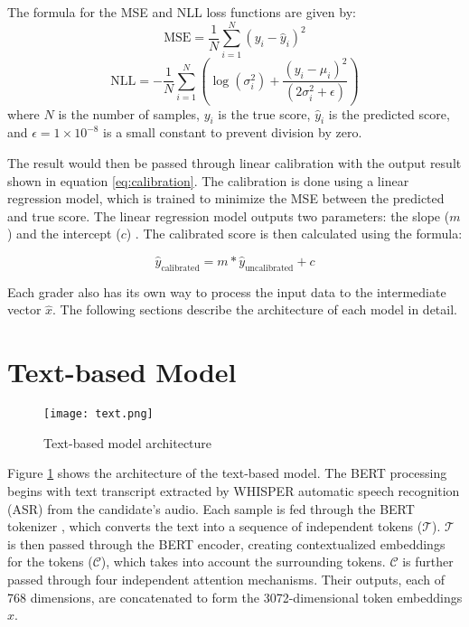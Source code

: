The formula for the MSE and NLL loss functions are given by:
\begin{equation} \label{eq:mse}
    \text{MSE} = \frac{1}{N} \sum_{i=1}^{N} (y_i - \hat{y}_i)^2
\end{equation}
\begin{equation} \label{eq:nll}
    \text{NLL} = -\frac{1}{N} \sum_{i=1}^{N} \left( \log(\sigma_i^2) + \frac{(y_i - \mu_i)^2}{(2\sigma_i^2 + \epsilon)} \right)
\end{equation}
where $N$ is the number of samples, $y_i$ is the true score,  $\hat{y}_i$ is the predicted score, and $\epsilon = 1\times10^{-8}$ is a small constant to prevent division by zero.

The result would then be passed through linear calibration with the output result shown in equation \ref{eq:calibration}. The calibration is done using a linear regression model, which is trained to minimize the MSE between the predicted and true score. The linear regression model outputs two parameters: the slope ($m$)  and the intercept ($c$) . The calibrated score is then calculated using the formula:

\begin{equation}
    \hat{y}_{\text{calibrated}} = m*\hat{y}_{\text{uncalibrated}} + c
    \label{eq:calibration}
\end{equation}

Each grader also has its own way to process the input data to the intermediate vector $\hat{x}$. The following sections describe the architecture of each model in detail.

\section{Text-based Model}
\begin{figure}[H]
    \centering
    \texttt{[image: text.png]}
    \caption{Text-based model architecture}
    \label{fig:text}
\end{figure}

Figure \ref{fig:text} shows the architecture of the text-based model. The BERT processing begins with text transcript extracted by WHISPER automatic speech recognition (ASR) from the candidate's audio. Each sample is fed through the BERT tokenizer , which converts the text into a sequence of independent tokens ($\mathcal{T}$). $\mathcal{T}$ is then passed through the BERT encoder, creating contextualized embeddings for the tokens ($\mathcal{C}$), which takes into account the surrounding tokens. $\mathcal{C}$ is further passed through four independent attention mechanisms. Their outputs, each of 768 dimensions, are concatenated to form the 3072-dimensional token embeddings $\hat{x}$.

